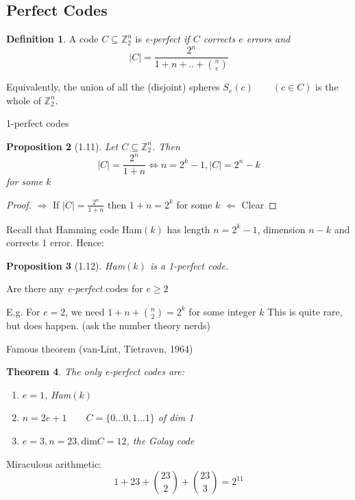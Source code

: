\documentclass[amsfonts]{amsart}
\newtheorem{thm}{Theorem}[section]
\newtheorem{prop}[thm]{Proposition}
\theoremstyle{definition}
\newtheorem{defn}[thm]{Definition}
\theoremstyle{remark}
\numberwithin{equation}{section}
\begin{document}
\subsection{Perfect Codes}
\begin{defn}
	A code $C \subseteq \mathbb{Z}_2^n$ is  \em{e-perfect} if $C$ corrects $e$ errors and \newline
	\[
	|C| = \frac{2^n}{1 + n + .. + {n \choose e}}
	\]

	Equivalently, the union of all the (disjoint) spheres $S_e(c)\qquad (c\in C)$ is the whole of $\mathbb{Z}_2^n$.
\end{defn}

1-perfect codes

\begin{prop}[1.11]
	Let $C \subseteq \mathbb{Z}_2^n$. Then \newline
	\[
		|C| = \frac{2^n}{1+n} \iff n=2^k-1, |C| = 2^n-k 
	\]
	for some $k$
\end{prop}

\begin{proof}
	
	$\Rightarrow$ \newline
	If $|C| = \frac{2^n}{1+n}$ then $1 +n = 2^k$ for some $k$ \newline
	$\Leftarrow$ Clear
\end{proof}

Recall that Hamming code Ham$(k)$ has length $n= 2^k-1$, dimension $n-k$ and corrects 1 error. Hence: \newline

\begin{prop}[1.12]
	Ham$(k)$ is a 1-perfect code.
\end{prop}

Are there any \emph{e-perfect} codes for $e\geq2$

E.g.\newline
For $e=2$, we need $1+n + {n \choose 2} = 2^k$ for some integer $k$ \newline
This is quite rare, but does happen. (ask the number theory nerds)
\par
Famous theorem (van-Lint, Tietraven, 1964)

\begin{thm}
The only \emph{e-perfect} codes are:
	\begin{enumerate}
		\item $e=1$, Ham$(k)$
		\item $n=2e+1\qquad C=\{0 ... 0, 1 ... 1\}$ of dim 1
		\item $e=3, n=23, \text{dim}C = 12$, the \em{Golay code}
	\end{enumerate}

\end{thm}
Miraculous arithmetic:\newline
\[
	1 + 23 + {23 \choose 2} + {23 \choose 3} = 2^{11}
\]
\end{document}
